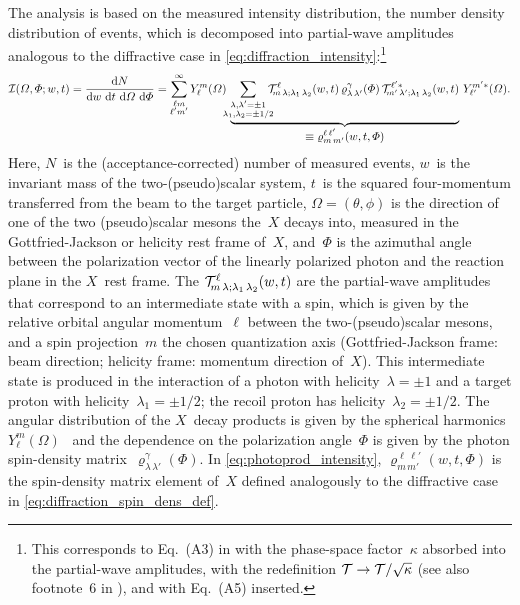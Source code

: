 The analysis is based on the measured intensity distribution, \ie the
number density distribution of events, which is decomposed into
partial-wave amplitudes analogous to the diffractive case in
\cref{eq:diffraction_intensity}:\footnote{\label{fn:photoprod_ampl_redef}This
corresponds to Eq.~(A3) in  with the
phase-space factor~$\kappa$ absorbed into the partial-wave amplitudes,
\ie with the redefinition $\mathcal{T} \to \mathcal{T} / \sqrt{\kappa}$ (see
also footnote~6 in ), and with Eq.~(A5)
inserted.}
\begin{equation}
  \label{eq:photoprod_intensity}
  \intensity(\Omega, \Phi; w, t)
  = \frac{\dif{N}}{\dif{w}\, \dif{t}\, \dif{\Omega}\, \dif{\Phi}}
  = \sum_{\substack{\ell m \\ \ell' m'}}^\infty
  Y_\ell^m(\Omega)~
  \dUnderbrace{\sum_{\substack{\lambda, \lambda' = \pm 1 \\ \mathclap{\lambda_1, \lambda_2 = \pm 1/2}}}
  \prodAmp^\ell_{\!m\, \lambda; \lambda_1\, \lambda_2}(w, t)\,
  \varrho^\gamma_{\lambda\, \lambda'}(\Phi)\,
  \prodAmp^{\ell' *}_{\!m'\, \lambda'; \lambda_1\, \lambda_2}(w, t)}{\equiv \varrho^{\ell\, \ell'}_{m\, m'}(w, t, \Phi)}~
  Y_{\ell'}^{m' *}(\Omega).
\end{equation}
Here, $N$~is the (acceptance-corrected) number of measured events,
$w$~is the invariant mass of the two-(pseudo)scalar system, $t$~is the
squared four-momentum transferred from the beam to the target
particle, $\Omega = (\theta, \phi)$ is the direction of one of the two
(pseudo)scalar mesons the~$X$ decays into, measured in the
Gottfried-Jackson or helicity rest frame of~$X$, and~$\Phi$ is the
azimuthal angle between the polarization vector of the linearly
polarized photon and the reaction plane in the $X$~rest frame.  The
$\mathcal{T}^\ell_{\!m\, \lambda; \lambda_1\, \lambda_2}(w, t)$ are
the partial-wave amplitudes that correspond to an intermediate state
with a spin, which is given by the relative orbital angular
momentum~$\ell$ between the two-(pseudo)scalar mesons, and a spin
projection~$m$ \wrt the chosen quantization axis (Gottfried-Jackson
frame: beam direction; helicity frame: momentum direction of~$X$).
This intermediate state is produced in the interaction of a photon
with helicity~$\lambda = \pm 1$ and a target proton with
helicity~$\lambda_1 = \pm 1/2$; the recoil proton has
helicity~$\lambda_2 = \pm 1/2$.  The angular distribution of the
$X$~decay products is given by the spherical harmonics
$Y_\ell^m(\Omega)$~\cite{wikipedia:sphericalHarm} and the dependence
on the polarization angle~$\Phi$ is given by the photon spin-density
matrix~$\varrho^\gamma_{\lambda\, \lambda'}(\Phi)$.  In
\cref{eq:photoprod_intensity}, $\varrho^{\ell\, \ell'}_{m\, m'}(w, t,
\Phi)$ is the spin-density matrix element of~$X$ defined analogously
to the diffractive case in \cref{eq:diffraction_spin_dens_def}.

